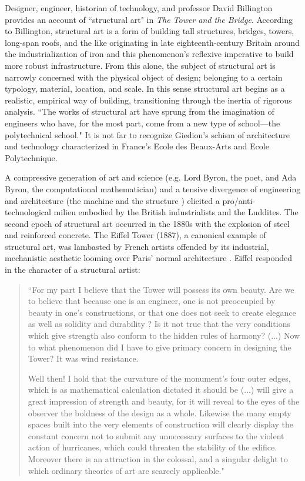 Designer, engineer, historian of technology, and professor David Billington provides an account of ``structural art" in \textit{The Tower and the Bridge}. According to Billington, structural art is a form of building tall structures, bridges, towers, long-span roofs, and the like originating in late eighteenth-century Britain around the industrialization of iron and this phenomenon's reflexive imperative to build more robust infrastructure.  \cite[p7]{TOWERANDBRIDGE} From this alone, the subject of structural art is narrowly concerned with the physical object of design; belonging to a certain typology, material, location, and scale. In this sense structural art begins as a realistic, empirical way of building, transitioning through the inertia of rigorous analysis. ``The works of structural art have sprung from the imagination of engineers who have, for the most part, come from a new type of school---the polytechnical school." \cite[p14]{TOWERANDBRIDGE} It is not far to recognize Giedion's schism of architecture and technology characterized in France's Ecole des Beaux-Arts and Ecole Polytechnique. \cite{SPACETIMEARCHITECTURE}

A compressive generation of art and science (e.g. Lord Byron, the poet, and Ada Byron, the computational mathematician) and a tensive divergence of engineering and architecture (the machine and the structure \cite[p11]{TOWERANDBRIDGE}) elicited a pro/anti-technological milieu embodied by the British industrialists and the Luddites. The second epoch of structural art occurred in the 1880s with the explosion of steel and reinforced concrete. The Eiffel Tower (1887), a canonical example of structural art, was lambasted by French artists offended by its industrial, mechanistic aesthetic looming over Paris' normal architecture \cite{EIFFELTOWER}. Eiffel responded in the character of a structural artist:

\begin{quote}
  \small{
  ``For my part I believe that the Tower will possess its own beauty. Are we to believe that because one is an engineer, one is not preoccupied by beauty in one's constructions, or that one does not seek to create elegance as well as solidity and durability ? Is it not true that the very conditions which give strength also conform to the hidden rules of harmony? (...) Now to what phenomenon did I have to give primary concern in designing the Tower? It was wind resistance.

  Well then! I hold that the curvature of the monument's four outer edges, which is as mathematical calculation dictated it should be (...) will give a great impression of strength and beauty, for it will reveal to the eyes of the observer the boldness of the design as a whole. Likewise the many empty spaces built into the very elements of construction will clearly display the constant concern not to submit any unnecessary surfaces to the violent action of hurricanes, which could threaten the stability of the edifice. Moreover there is an attraction in the colossal, and a singular delight to which ordinary theories of art are scarcely applicable."} \cite{EIFFELTOWER}
\end{quote}

